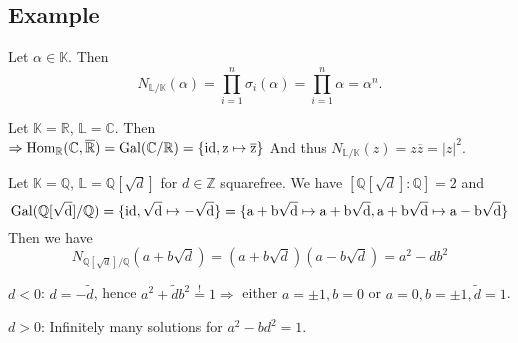 \documentclass[12pt]{book}
\begin{document}
\begin{spacing}{1.3}
\begin{compactenum}
\end{compactenum}
\allowdisplaybreaks[1]
\subsection*{Example}%
\titleformat{\subsection}{\normalfont\normalsize\bfseries}{}{0em}{#1 \thesubsection}
\begin{compactenum}
\item Let $\alpha \in \mathbb{K}$. Then\\
$$N_{\mathbb{L}/\mathbb{K}}(\alpha)=\prod_{i=1}^n \sigma_i(\alpha)=\prod_{i=1}^n \alpha = \alpha^n.$$
\item Let $\mathbb{K}=\mathbb{R}$, $\mathbb{L}=\mathbb{C}$. Then\\
$\Rightarrow \rm{Hom}_{\mathbb{R}}(\mathbb{C}, \overline{\mathbb{R}})=\rm{Gal}(\mathbb{C}/\mathbb{R})=\{\rm{id}, z \mapsto \overline{z}\}$ And thus
$N_{\mathbb{L}/\mathbb{K}}(z)=z\overline{z}=\vert z\vert^2$.
\item Let $\mathbb{K}=\mathbb{Q}$, $\mathbb{L}=\mathbb{Q}[\sqrt{d}]$ for $d \in \mathbb{Z}$ squarefree. We have $[\mathbb{Q}[\sqrt{d}]:\mathbb{Q}]=2$ and 
$$\rm{Gal}(\mathbb{Q}[\sqrt{d}]/\mathbb{Q})=\{\rm{id}, \sqrt{d} \mapsto -\sqrt{d}\}=\{a+b\sqrt{d} \mapsto a+b\sqrt{d}, a+b\sqrt{d} \mapsto a-b\sqrt{d}\}$$
Then we have
$$N_{\mathbb{Q}[\sqrt{d}]/\mathbb{Q}}(a+b\sqrt{d})=\left(a+b\sqrt{d}\right)\left(a-b\sqrt{d}\right)=a^2-db^2$$
\begin{compactitem}
\item $d<0$: $d=-\tilde{d}$, hence $a^2+\tilde{d}b^2\overset{!}{=}1 \Rightarrow $ either $ a=\pm 1, b=0$ or $a=0, b=\pm 1, \tilde{d}=1$.
\item $d>0$: Infinitely many solutions for $a^2-bd^2=1$.
\end{compactitem}
\end{compactenum}

\allowdisplaybreaks[1]

\end{spacing}
\end{document}
